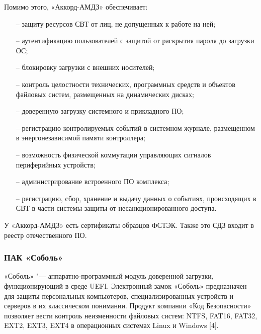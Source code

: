 Помимо этого, «Аккорд-АМДЗ» обеспечивает:
\begin{itemize}
  \item[--] защиту ресурсов СВТ от лиц, не допущенных к работе на ней;
  \item[--] аутентификацию пользователей с защитой от раскрытия пароля до загрузки ОС;
  \item[--] блокировку загрузки с внешних носителей;
  \item[--] контроль целостности технических, программных средств и объектов файловых систем, размещенных на динамических дисках;
  \item[--] доверенную загрузку системного и прикладного ПО;
  \item[--] регистрацию контролируемых событий в системном журнале, размещенном в энергонезависимой памяти контроллера;
  \item[--] возможность физической коммутации управляющих сигналов периферийных устройств;
  \item[--] администрирование встроенного ПО комплекса;
  \item[--] регистрацию, сбор, хранение и выдачу данных о событиях, происходящих в СВТ в части системы защиты от несанкционированного доступа.
\end{itemize}

У «Аккорд-АМДЗ» есть сертификаты образцов ФСТЭК. Также это СДЗ входит в реестр отечественного ПО.

\subsubsection{ПАК «Соболь»}
«Соболь» "--- аппаратно-программный модуль доверенной загрузки, функционирующий в среде UEFI. 
Электронный замок «Соболь» предназначен для защиты персональных компьютеров, 
специализированных устройств и серверов в их классическом понимании. Продукт компании 
«Код Безопасности» позволяет вести контроль неизменности файловых систем: NTFS, FAT16,
 FAT32, EXT2, EXT3, EXT4 в операционных системах Linux и Windows [4].

